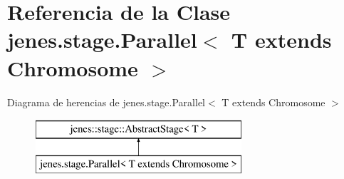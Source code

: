 \hypertarget{classjenes_1_1stage_1_1_parallel_3_01_t_01extends_01_chromosome_01_4}{\section{Referencia de la Clase jenes.\-stage.\-Parallel$<$ T extends Chromosome $>$}
\label{classjenes_1_1stage_1_1_parallel_3_01_t_01extends_01_chromosome_01_4}
}
Diagrama de herencias de jenes.\-stage.\-Parallel$<$ T extends Chromosome $>$\begin{figure}[H]
\begin{center}
\leavevmode
\includegraphics[height=2.000000cm]{classjenes_1_1stage_1_1_parallel_3_01_t_01extends_01_chromosome_01_4}
\end{center}
\end{figure}
